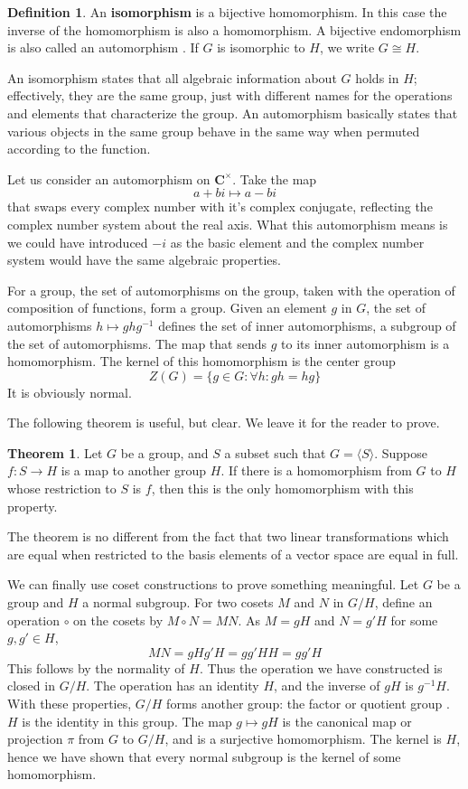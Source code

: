 \documentclass[12pt]{amsbook}
\theoremstyle{definition}
\newtheorem{theorem}{Theorem}[chapter]
\newtheorem{definition}{Definition}
\newcommand{\gen}[1]{\langle #1 \rangle} %
\begin{document}
\begin{definition}
    An {\bf isomorphism}  is a bijective homomorphism. In this case the inverse of the homomorphism is also a homomorphism. A bijective endomorphism is also called an automorphism . If $G$ is isomorphic to $H$, we write $G \cong H$.
\end{definition}

An isomorphism states that all algebraic information about $G$ holds in $H$; effectively, they are the same group, just with different names for the operations and elements that characterize the group. An automorphism basically states that various objects in the same group behave in the same way when permuted according to the function.

Let us consider an automorphism on $\mathbf{C}^\times$. Take the map
%
\[ a + bi \mapsto a - bi \]
%
that swaps every complex number with it's complex conjugate, reflecting the complex number system about the real axis. What this automorphism means is we could have introduced $-i$ as the basic element and the complex number system would have the same algebraic properties.

For a group, the set of automorphisms on the group, taken with the operation of composition of functions, form a group. Given an element $g$ in $G$, the set of automorphisms $h \mapsto ghg^{-1}$ defines the set of inner automorphisms, a subgroup of the set of automorphisms. The map that sends $g$ to its inner automorphism is a homomorphism. The kernel of this homomorphism is the center group
%
\[Z(G) = \{ g \in G : \forall h: gh = hg \}\]
%
It is obviously normal.

The following theorem is useful, but clear. We leave it for the reader to prove.

\begin{theorem}
    Let $G$ be a group, and $S$ a subset such that $G = \gen{S}$. Suppose $f:S \to H$ is a map to another group $H$. If there is a homomorphism from $G$ to $H$ whose restriction to $S$ is $f$, then this is the only homomorphism with this property.
\end{theorem}

The theorem is no different from the fact that two linear transformations which are equal when restricted to the basis elements of a vector space are equal in full.

We can finally use coset constructions to prove something meaningful. Let $G$ be a group and $H$ a normal subgroup. For two cosets $M$ and $N$ in $G/H$, define an operation $\circ$ on the cosets by $M \circ N = MN$. As $M = gH$ and $N = g'H$ for some $g,g' \in H$,
%
\[ MN = gHg'H = gg'HH = gg'H \]
%
This follows by the normality of $H$. Thus the operation we have constructed is closed in $G/H$. The operation has an identity $H$, and the inverse of $gH$ is $g^{-1}H$. With these properties, $G/H$ forms another group: the factor or quotient group  . $H$ is the identity in this group. The map $g \mapsto gH$ is the canonical map or projection $\pi$ from $G$ to $G/H$, and is a surjective homomorphism. The kernel is $H$, hence we have shown that every normal subgroup is the kernel of some homomorphism.
\end{document}
